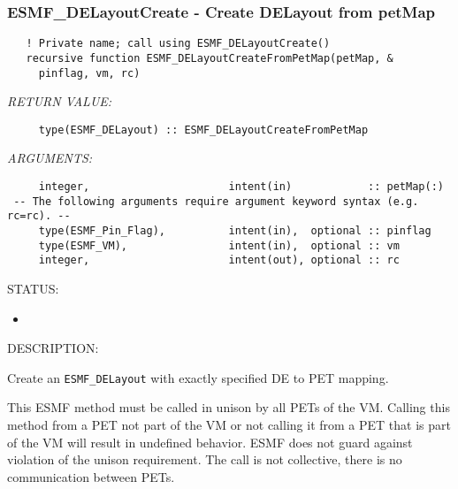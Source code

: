 \subsubsection [ESMF\_DELayoutCreate] {ESMF\_DELayoutCreate - Create DELayout from petMap}


 
\begin{verbatim}   ! Private name; call using ESMF_DELayoutCreate()
   recursive function ESMF_DELayoutCreateFromPetMap(petMap, &
     pinflag, vm, rc)
           \end{verbatim}{\em RETURN VALUE:}
\begin{verbatim}     type(ESMF_DELayout) :: ESMF_DELayoutCreateFromPetMap\end{verbatim}{\em ARGUMENTS:}
\begin{verbatim}     integer,                      intent(in)            :: petMap(:)
 -- The following arguments require argument keyword syntax (e.g. rc=rc). --
     type(ESMF_Pin_Flag),          intent(in),  optional :: pinflag
     type(ESMF_VM),                intent(in),  optional :: vm
     integer,                      intent(out), optional :: rc\end{verbatim}
{\sf STATUS:}
   \begin{itemize}
   \item{}
   \end{itemize}
  
{\sf DESCRIPTION:\\ }


       Create an {\tt ESMF\_DELayout} with exactly specified DE to PET mapping.
  
       This ESMF method must be called in unison by all PETs of the VM. Calling
       this method from a PET not part of the VM or not calling it from a PET
       that is part of the VM will result in undefined behavior. ESMF does not
       guard against violation of the unison requirement. The call is not
       collective, there is no communication between PETs.
  

